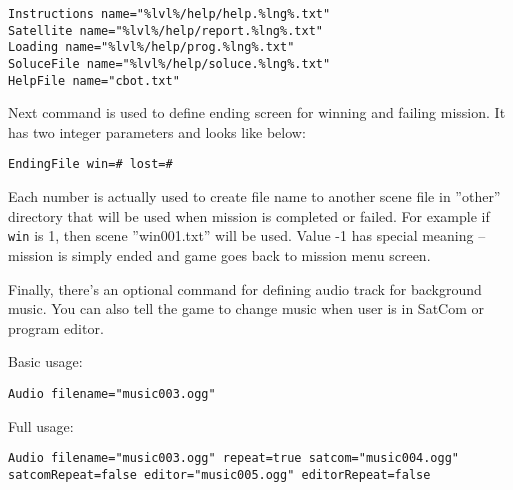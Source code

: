 \begin{lstlisting}[style=scene]
Instructions name="%lvl%/help/help.%lng%.txt"
Satellite name="%lvl%/help/report.%lng%.txt"
Loading name="%lvl%/help/prog.%lng%.txt"
SoluceFile name="%lvl%/help/soluce.%lng%.txt"
HelpFile name="cbot.txt"
\end{lstlisting}

Next command is used to define ending screen for winning and failing mission. It has two integer parameters and looks like below:

\begin{lstlisting}[style=scene]
EndingFile win=# lost=#
\end{lstlisting}

Each number is actually used to create file name to another scene file in ''other'' directory that will be used when mission is completed or failed. For example if \texttt{win} is 1, then scene ''win001.txt'' will be used. Value -1 has special meaning -- mission is simply ended and game goes back to mission menu screen.


Finally, there's an optional command for defining audio track for background music. You can also tell the game to change music when user is in SatCom or program editor.

Basic usage:
\begin{verbatim}
Audio filename="music003.ogg"
\end{verbatim}

Full usage:
\begin{verbatim}
Audio filename="music003.ogg" repeat=true satcom="music004.ogg" satcomRepeat=false editor="music005.ogg" editorRepeat=false
\end{verbatim}




